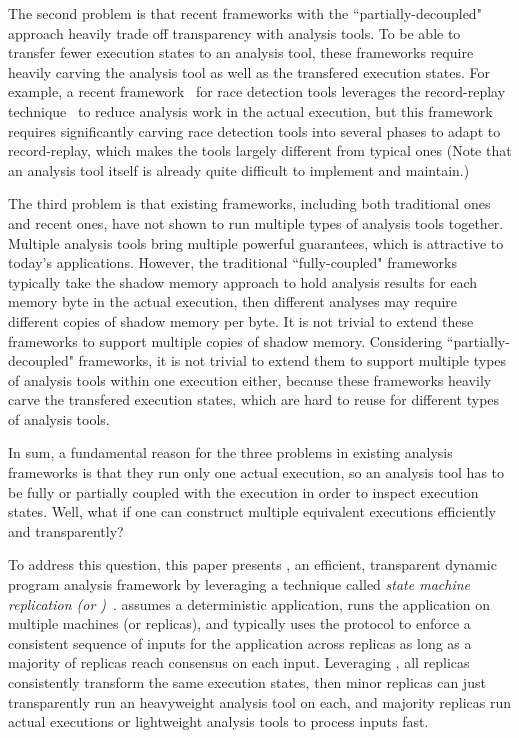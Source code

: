 The second problem is that recent frameworks with the ``partially-decoupled"
approach heavily trade off transparency with analysis tools. To be able to
transfer fewer execution states to an analysis tool, these frameworks require
heavily carving the analysis tool as well as the transfered execution states.
For example, a recent framework~\cite{wester:parallelizing:asplos13} for race
detection tools leverages the record-replay
technique~\cite{scribe:sigmetrics2010, respec:asplos10, racepro:sosp11} to
reduce analysis work in the actual execution, but this framework
requires significantly carving race detection tools into several phases to adapt
to record-replay, which makes the tools largely different from typical ones
(Note that an analysis tool itself is already quite difficult to implement and
maintain.)


The third problem is that existing frameworks, including both traditional ones
and recent ones, have not shown to run multiple types of analysis tools 
together. Multiple analysis tools bring multiple powerful
guarantees, which is attractive to today's applications. However, the
traditional ``fully-coupled" frameworks typically take the shadow memory 
approach to hold analysis results for each memory byte in the actual execution, 
then different analyses may require different copies of shadow memory per byte. 
It is not trivial to extend these frameworks to support multiple copies of 
shadow memory. Considering ``partially-decoupled" frameworks, it is not trivial 
to extend them to support multiple types of analysis tools within one execution 
either, because these frameworks heavily carve the transfered execution states, 
which are hard to reuse for different types of analysis tools.


In sum, a fundamental reason for the three problems in existing analysis 
frameworks is that they run only one actual execution, so an analysis tool has
to be fully or partially coupled with the execution in order to inspect
execution states. Well, what if one can construct multiple equivalent
executions efficiently and transparently?




To address this question, this paper presents \xxx, an efficient, 
transparent dynamic program analysis framework by leveraging a technique called 
\emph{state machine replication (or \smr)}~\cite{paxos:simple, 
paxos:practical, paxos}. \smr assumes a deterministic application, runs the 
application on multiple machines (or replicas), and typically uses the \paxos 
protocol to enforce a consistent sequence of inputs for the application across 
replicas as long as a majority of replicas reach consensus on each input. 
Leveraging \smr, all replicas consistently transform the same execution states, 
then minor replicas can just transparently run an heavyweight analysis tool on 
each, and majority replicas run actual executions or lightweight analysis tools 
to process inputs fast.


